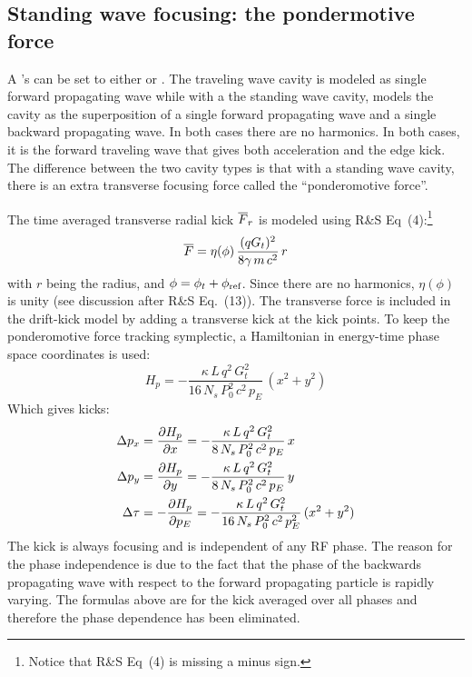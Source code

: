\subsection{Standing wave focusing: the pondermotive force}

A 's  can be set to either  or
. The traveling wave cavity is modeled as single forward propagating wave while
with a the standing wave cavity, \bmad models the cavity as the superposition of a single forward
propagating wave and a single backward propagating wave. In both cases there are no harmonics.  In
both cases, it is the forward traveling wave that gives both acceleration and the edge kick.  The
difference between the two cavity types is that with a standing wave cavity, there is an extra
transverse focusing force called the ``ponderomotive force''.

The time averaged transverse radial kick $\overline{F}_r$ is modeled using R\&S Eq~(4):\footnote
  {
Notice that R\&S Eq~(4) is missing a minus sign.
  }
\begin{equation}
  \overline{F} =  \eta(\phi) \, \frac{(q G_t)^2}{8 \gamma \, m \, c^2} \, r
\end{equation}
with $r$ being the radius, and $\phi = \phi_t + \phi_{\text{ref}}$. Since there are
no harmonics, $\eta(\phi)$ is unity (see discussion after R\&S Eq.~(13)). The transverse force is
included in the drift-kick model by adding a transverse kick at the kick points.
To keep the ponderomotive force tracking symplectic, a Hamiltonian in energy-time
phase space coordinates is used:
\begin{equation}
  H_p = -\frac{\kappa \, L \, q^2 \, G_t^2}{16 \, N_s \, P_0^2 \, c^2 \, p_E} \, (x^2 + y^2)
\end{equation}
Which gives kicks:
\begin{align}
  \Delta p_x &= \frac{\partial H_p}{\partial x} 
              = -\frac{\kappa \, L \, q^2 \, G_t^2}{8 \, N_s \, P_0^2 \, c^2 \, p_E} \, x \nonumber \\
  \Delta p_y &= \frac{\partial H_p}{\partial y} 
              = -\frac{\kappa \, L \, q^2 \, G_t^2}{8 \, N_s \, P_0^2 \, c^2 \, p_E} \, y \\
  \Delta \tau &= -\frac{\partial H_p}{\partial p_E} 
              = -\frac{\kappa \, L \, q^2 \, G_t^2}{16 \, N_s \, P_0^2 \, c^2 \, p_E^2} \, (x^2 + y^2) \nonumber
\end{align}
The kick is always focusing and is independent of any RF phase. The reason for the phase
independence is due to the fact that the phase of the backwards propagating wave with respect to the
forward propagating particle is rapidly varying. The formulas above are for the kick averaged over
all phases and therefore the phase dependence has been eliminated.

